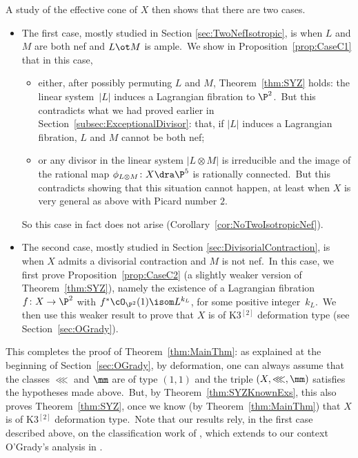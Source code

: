A study of the effective cone of $X$ then shows that there are two cases.
\begin{itemize}
    \item The first case, mostly studied in Section \ref{sec:TwoNefIsotropic}, is when $L$ and $M$ are both nef and $L\ot M$ is ample.\
We show in  Proposition~\ref{prop:CaseC1} that in this case,
\begin{itemize}
    \item[$\circ$] either, after possibly permuting $L$ and $M$, Theorem~\ref{thm:SYZ} holds:   the linear system~$|L|$ induces a Lagrangian fibration to $\P^2$.\ But this contradicts what we had proved earlier in Section~\ref{subsec:ExceptionalDivisor}: that, if $|L|$ induces a Lagrangian fibration, $L$ and $M$ cannot be both nef;
    \item[$\circ$] or any divisor in the linear system $|L\otimes M|$ is irreducible and  the image of the rational map $\phi_{L\otimes M}\colon X\dra \P^5$ is rationally connected.\ But this contradicts   \cite[Theorem 4.2]{voisinfib}   showing that this situation cannot happen, at least when $X$ is very general as above  with Picard number $2$.
\end{itemize}
So this case in fact  does not arise (Corollary~\ref{cor:NoTwoIsotropicNef}).
    \item The second case, mostly studied in Section \ref{sec:DivisorialContraction}, is when $X$ admits a divisorial contraction and $M$ is not nef.\
    In this case, we  first prove Proposition~\ref{prop:CaseC2} (a slightly weaker version of Theorem~\ref{thm:SYZ}), namely the existence of a Lagrangian fibration $f\colon X\to\P^2$ with $f^*{\cO_{\P^2}}(1)\isom L^{k_L}$, for some positive integer~$k_L$.\
    We then use this weaker result to prove that $X$ is of  K3$^{[2]}$ deformation type (see Section~\ref{sec:OGrady}).
\end{itemize}

This completes the proof of Theorem~\ref{thm:MainThm}: as explained at the beginning of Section~\ref{sec:OGrady}, by deformation, one can always assume that the classes $\lll$ and $\mm$ are of type $(1,1)$ and the triple $(X,\lll,\mm)$ satisfies the hypotheses made above.\
But, by Theorem~\ref{thm:SYZKnownExs}, this also proves  Theorem~\ref{thm:SYZ}, once we know (by Theorem~\ref{thm:MainThm}) that $X$ is of  K3$^{[2]}$ deformation type.\ Note that our results rely, in the first case described above, on the classification work of \cite[Section 4]{voisinfib}, which extends to our context O'Grady's analysis in \cite{og1}.

